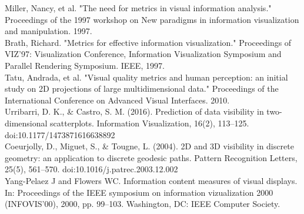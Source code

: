 \documentclass[a4paper,11pt]{article}
\begin{document}
Miller, Nancy, et al. "The need for metrics in visual information analysis." Proceedings of the 1997 workshop on New paradigms in information visualization and manipulation. 1997.\\

Brath, Richard. "Metrics for effective information visualization." Proceedings of VIZ'97: Visualization Conference, Information Visualization Symposium and Parallel Rendering Symposium. IEEE, 1997.\\

Tatu, Andrada, et al. "Visual quality metrics and human perception: an initial study on 2D projections of large multidimensional data." Proceedings of the International Conference on Advanced Visual Interfaces. 2010.\\

Urribarri, D. K., \& Castro, S. M. (2016). Prediction of data visibility in two-dimensional scatterplots. Information Visualization, 16(2), 113–125. doi:10.1177/1473871616638892\\

Coeurjolly, D., Miguet, S., \& Tougne, L. (2004). 2D and 3D visibility in discrete geometry: an application to discrete geodesic paths. Pattern Recognition Letters, 25(5), 561–570. doi:10.1016/j.patrec.2003.12.002\\

Yang-Pelaez J and Flowers WC. Information content
measures of visual displays. In: Proceedings of the IEEE symposium on information vizualization 2000 (INFOVIS’00), 2000, pp. 99–103. Washington, DC: IEEE Computer Society.
\end{document}
